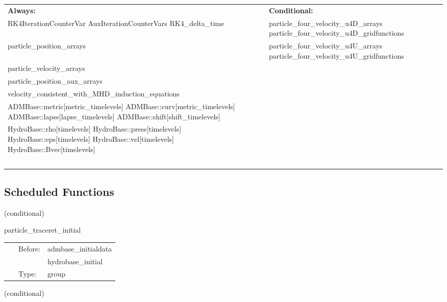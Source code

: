  \begin{tabular*}{160mm}{ll} 

{\bf Always:}& {\bf Conditional:} \\ 
 RK4IterationCounterVar AuxIterationCounterVars RK4\_delta\_time &  particle\_four\_velocity\_u4D\_arrays particle\_four\_velocity\_u4D\_gridfunctions\\ 
 particle\_position\_arrays &  particle\_four\_velocity\_u4U\_arrays particle\_four\_velocity\_u4U\_gridfunctions\\ 
 particle\_velocity\_arrays & ~\\ 
 particle\_position\_aux\_arrays & ~\\ 
 velocity\_consistent\_with\_MHD\_induction\_equations & ~\\ 
 ADMBase::metric[metric\_timelevels] ADMBase::curv[metric\_timelevels] ADMBase::lapse[lapse\_timelevels] ADMBase::shift[shift\_timelevels] & ~\\ 
 HydroBase::rho[timelevels] HydroBase::press[timelevels] HydroBase::eps[timelevels] HydroBase::vel[timelevels] HydroBase::Bvec[timelevels] & ~\\ 
~ & ~\\ 
\end{tabular*} 


\subsection*{Scheduled Functions}
\vspace{5mm}

   (conditional) 

\hspace{5mm} particle\_traceret\_initial 

\hspace{5mm}{\it initialization routines of the particle\_traceret thorn } 


\hspace{5mm}

 \begin{tabular*}{160mm}{cll} 
~ & Before:  & admbase\_initialdata \\ 
~& ~ &hydrobase\_initial\\ 
~ & Type:  & group \\ 
\end{tabular*} 


\vspace{5mm}

   (conditional) 

